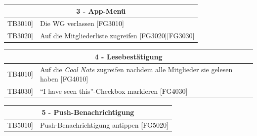 \documentclass[a4paper]{scrreprt}
\begin{document}
	    \vspace{5mm}
	    
	    \begin{table}[h!]
	    	\centering
	    	\label{my-label}
	    	\begin{tabular}{p{2cm}p{12cm}}
	    		
	    		\multicolumn{2}{c}{\textbf{3 - App-Menü}} \\ \hline
	    		\centering{[}TB3010{]} & Die WG verlassen {[}FG3010{]}\\
	    		\centering{[}TB3020{]} & Auf die Mitgliederliste zugreifen {[}FG3020{]}{[}FG3030{]}\\
	    		\hline
	    	\end{tabular}
	    \end{table}
	    
	    \vspace{5mm}
	    
	    \begin{table}[h!]
	    	\centering
	    	\label{my-label}
	    	\begin{tabular}{p{2cm}p{12cm}}
	    		
	    		\multicolumn{2}{c}{\textbf{4 - Lesebestätigung}} \\ \hline
	    		\centering{[}TB4010{]} & Auf die \textit{Cool Note} zugreifen nachdem alle Mitglieder sie  gelesen haben {[}FG4010{]}\\
	    		\centering{[}TB4030{]}& ``I have seen this''-Checkbox markieren {[}FG4030{]}\\ 
	    		
	    		\hline
	    	\end{tabular}
	    \end{table}
	    
	    \vspace{5mm}
	    
	    \begin{table}[h!]
	    	\centering
	    	\label{my-label}
	    	\begin{tabular}{p{2cm}p{12cm}}
	    		
	    		\multicolumn{2}{c}{\textbf{5 - Push-Benachrichtigung}} \\ \hline
	    		\centering{[}TB5010{]} & Push-Benachrichtigung antippen {[}FG5020{]}\\
	    		
	    		
	    		\hline
	    	\end{tabular}
	    \end{table}
	    
	    \clearpage
	    
\end{document}
